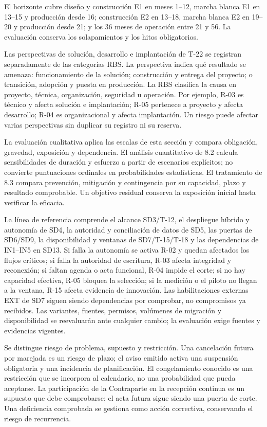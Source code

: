 El horizonte cubre diseño y construcción E1 en meses 1--12, marcha blanca E1 en 13--15 y producción desde 16; construcción E2 en 13--18, marcha blanca E2 en 19--20 y producción desde 21; y los 36 meses de operación entre 21 y 56. La evaluación conserva los solapamientos y los hitos obligatorios. \parencite[arts.~15 y 17; pp.~11--13]{sd8-ba}

Las perspectivas de solución, desarrollo e implantación de T-22 se registran separadamente de las categorías RBS. La perspectiva indica qué resultado se amenaza: funcionamiento de la solución; construcción y entrega del proyecto; o transición, adopción y puesta en producción. La RBS clasifica la causa en proyecto, técnica, organización, seguridad u operación. Por ejemplo, R-03 es técnico y afecta solución e implantación; R-05 pertenece a proyecto y afecta desarrollo; R-04 es organizacional y afecta implantación. Un riesgo puede afectar varias perspectivas sin duplicar su registro ni su reserva. \parencite[Formulario T-22, p.~68]{sd8-ba}

La evaluación cualitativa aplica las escalas de esta sección y compara obligación, gravedad, exposición y dependencia. El análisis cuantitativo de 8.2 calcula sensibilidades de duración y esfuerzo a partir de escenarios explícitos; no convierte puntuaciones ordinales en probabilidades estadísticas. El tratamiento de 8.3 compara prevención, mitigación y contingencia por su capacidad, plazo y resultado comprobable. Un objetivo residual conserva la exposición inicial hasta verificar la eficacia.

La línea de referencia comprende el alcance SD3/T-12, el despliegue híbrido y autonomía de SD4, la autoridad y conciliación de datos de SD5, las puertas de SD6/SD9, la disponibilidad y ventanas de SD7/T-15/T-18 y las dependencias de IN1--IN5 en SD13. Si falla la autonomía se activa R-02 y quedan afectados los flujos críticos; si falla la autoridad de escritura, R-03 afecta integridad y reconexión; si faltan agenda o acta funcional, R-04 impide el corte; si no hay capacidad efectiva, R-05 bloquea la selección; si la medición o el piloto no llegan a la ventana, R-15 afecta evidencia de innovación. Las habilitaciones externas EXT de SD7 siguen siendo dependencias por comprobar, no compromisos ya recibidos. Las variantes, fuentes, permisos, volúmenes de migración y disponibilidad se reevaluarán ante cualquier cambio; la evaluación exige fuentes y evidencias vigentes.

Se distingue riesgo de problema, supuesto y restricción. Una cancelación futura por marejada es un riesgo de plazo; el aviso emitido activa una suspensión obligatoria y una incidencia de planificación. El congelamiento conocido es una restricción que se incorpora al calendario, no una probabilidad que pueda aceptarse. La participación de la Contraparte en la recepción continua es un supuesto que debe comprobarse; el acta futura sigue siendo una puerta de corte. Una deficiencia comprobada se gestiona como acción correctiva, conservando el riesgo de recurrencia.

